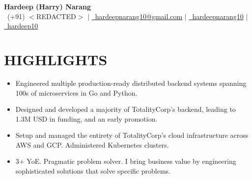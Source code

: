 \documentclass[a4paper,20pt]{article}
\renewcommand{\labelitemi}{$\vcenter{\hbox{\boldmath$\cdot$}}$}
\begin{document}
\begin{center}
    \textbf{{\LARGE Hardeep (Harry) Narang}}\\[0.08in]
    {{\faPhone~\small(+91) $<$REDACTED$>$}} $|$
    \href{mailto:hardeepnarang10@gmail.com}
    {{\faEnvelope~hardeepnarang10@gmail.com}} $|$
    \href{https://github.com/hardeepnarang10}{{\faGithub~hardeepnarang10}} $|$
    \href{https://linkedin.com/in/hardeep10}{{\faLinkedinSquare~hardeep10}}
    \\
\end{center}

\vspace{-3pt}
\section{\textbf{HIGHLIGHTS}}
\begin{itemize}[leftmargin=8pt]
\justifying
\small
\vspace{3pt}
\renewcommand{\labelitemi}{$\vcenter{\hbox{\boldmath$\cdot$}}$}
\item Engineered multiple production-ready distributed backend systems spanning 100s of microservices in Go and Python.
\vspace{-6pt}
\item Designed and developed a majority of TotalityCorp’s backend, leading to 1.3M USD in funding, and an early promotion.
\vspace{-6pt}
\item Setup and managed the entirety of TotalityCorp's cloud infrastructure across AWS and GCP. Administered Kubernetes clusters.
\vspace{-6pt}
\vspace{-11pt}
\item 3+ YoE. Pragmatic problem solver. I bring business value by engineering sophisticated solutions that solve specific problems.
\end{itemize}
\vspace{-5pt}
\end{document}
